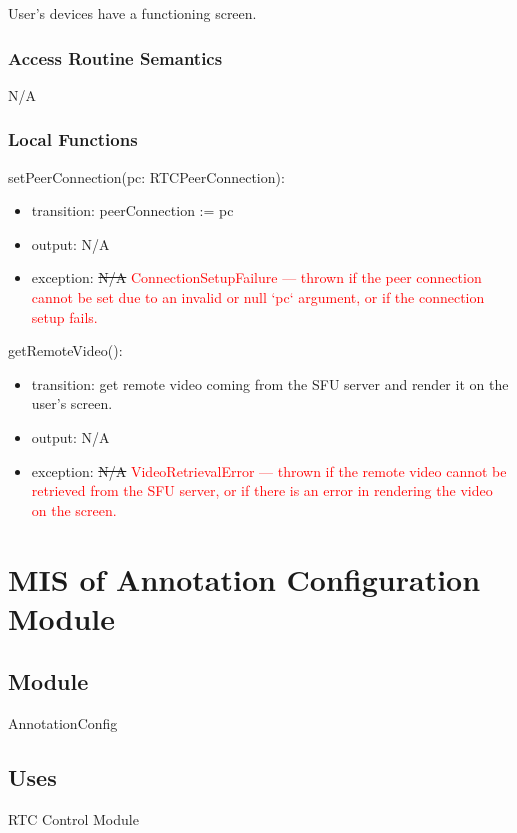\documentclass[12pt, titlepage]{article}
\newcommand{\rt}[1]{\textcolor{red}{#1}}
\begin{document}
User's devices have a functioning screen.

\subsubsection{Access Routine Semantics}

N/A

\subsubsection{Local Functions}

\noindent setPeerConnection(pc: RTCPeerConnection):
\begin{itemize}
\item transition: peerConnection := pc
\item output: N/A
\item exception: \sout{N/A} \rt{ConnectionSetupFailure --- thrown if the peer connection cannot be set due to an invalid or null `pc` argument, or if the connection setup fails.}
\end{itemize}

\noindent getRemoteVideo():
\begin{itemize}
\item transition: get remote video coming from the SFU server and render it on the
  user's screen.
\item output: N/A
\item exception: \sout{N/A} \rt{VideoRetrievalError --- thrown if the remote video cannot be retrieved from the SFU server, or if there is an error in rendering the video on the screen.}
\end{itemize}


\section{MIS of Annotation Configuration Module} \label{sec:annoconfig}

\subsection{Module}

AnnotationConfig

\subsection{Uses}

\noindent RTC Control Module
\end{document}
